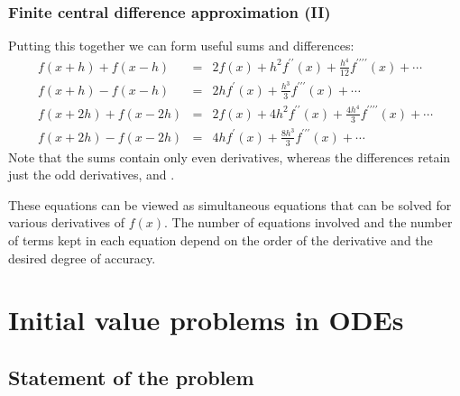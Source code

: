 \documentclass[hyperref={colorlinks=true}]{beamer}
\begin{document}
\begin{frame}%
  \frametitle{Finite central difference approximation (II)}

  Putting this together we can form useful sums and differences:
  \begin{eqnarray}
    f(x+h) + f(x-h)   &=& 2f(x) + h^2f^{\prime\prime}(x) + \frac{h^4}{12}f^{\prime\prime\prime\prime}(x) + \cdots \nonumber \\
    f(x+h) - f(x-h)   &=& 2hf^{\prime}(x) + \frac{h^3}{3}f^{\prime\prime\prime}(x) +  \cdots \nonumber \\
    f(x+2h) + f(x-2h) &=& 2f(x) + 4h^2f^{\prime\prime}(x) + \frac{4h^4}{3}f^{\prime\prime\prime\prime}(x) + \cdots \nonumber \\
    f(x+2h) - f(x-2h) &=& 4hf^{\prime}(x) + \frac{8h^3}{3}f^{\prime\prime\prime}(x) + \cdots \nonumber
  \end{eqnarray}
  Note that the sums contain only even derivatives, whereas the differences retain just the odd derivatives, and .
  
  \mysp
  
  These equations can be viewed as simultaneous equations that can be solved for various derivatives of $f(x)$. The number of equations involved and the number of terms kept in each equation depend on the order of the derivative and the desired degree of accuracy.

\end{frame}

\section[Initial value problems in ODEs]{Initial value problems in ODEs}

\subsection[Statement of the problem]{Statement of the problem}
\end{document}
